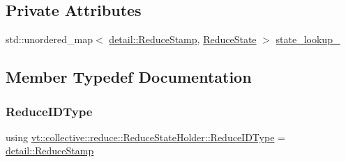 \subsection*{Private Attributes}
\begin{DoxyCompactItemize}
\item 
std\+::unordered\+\_\+map$<$ \hyperlink{namespacevt_1_1collective_1_1reduce_1_1detail_aacc1fcd729d934ba143fee3a943bf9e7}{detail\+::\+Reduce\+Stamp}, \hyperlink{structvt_1_1collective_1_1reduce_1_1_reduce_state}{Reduce\+State} $>$ \hyperlink{structvt_1_1collective_1_1reduce_1_1_reduce_state_holder_ab30bde72498ebf851969c1914c3378c6}{state\+\_\+lookup\+\_\+}
\end{DoxyCompactItemize}


\subsection{Member Typedef Documentation}
\mbox{\label{structvt_1_1collective_1_1reduce_1_1_reduce_state_holder_ac75b7127c84d699f42c0bc3f3b02bb0b}} 
\subsubsection{\texorpdfstring{Reduce\+I\+D\+Type}{ReduceIDType}}
{\footnotesize\ttfamily using \hyperlink{structvt_1_1collective_1_1reduce_1_1_reduce_state_holder_ac75b7127c84d699f42c0bc3f3b02bb0b}{vt\+::collective\+::reduce\+::\+Reduce\+State\+Holder\+::\+Reduce\+I\+D\+Type} =  \hyperlink{namespacevt_1_1collective_1_1reduce_1_1detail_aacc1fcd729d934ba143fee3a943bf9e7}{detail\+::\+Reduce\+Stamp}}

\mbox{\label{structvt_1_1collective_1_1reduce_1_1_reduce_state_holder_a4a87ec20428609cb6c8ec49c11893389}} 
